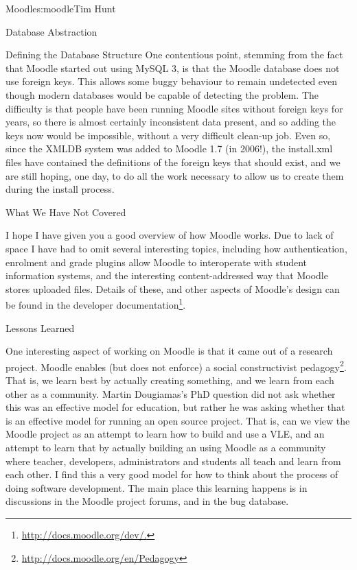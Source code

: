 \begin{aosachapter}{Moodle}{s:moodle}{Tim Hunt}
\begin{aosasect1}{Database Abstraction}
\begin{aosasect2}{Defining the Database Structure}
One contentious point, stemming from the fact that Moodle started out
using MySQL 3, is that the Moodle database does not use foreign
keys. This allows some buggy behaviour to remain undetected even
though modern databases would be capable of detecting the problem. The
difficulty is that people have been running Moodle sites without
foreign keys for years, so there is almost certainly inconsistent data
present, and so adding the keys now would be impossible, without a
very difficult clean-up job. Even so, since the XMLDB system was added
to Moodle 1.7 (in 2006!), the install.xml files have contained the
definitions of the foreign keys that should exist, and we are still
hoping, one day, to do all the work necessary to allow us to create
them during the install process.

\end{aosasect2}

\end{aosasect1}

\begin{aosasect1}{What We Have Not Covered}

I hope I have given you a good overview of how Moodle works. Due to
lack of space I have had to omit several interesting topics, including
how authentication, enrolment and grade plugins allow Moodle to
interoperate with student information systems, and the interesting
content-addressed way that Moodle stores uploaded files. Details of
these, and other aspects of Moodle's design can be found in the
developer documentation\footnote{\url{http://docs.moodle.org/dev/.}}.

\end{aosasect1}

\begin{aosasect1}{Lessons Learned}

One interesting aspect of working on Moodle is that it came out of a
research project. Moodle enables (but does not enforce) a social
constructivist
pedagogy\footnote{\url{http://docs.moodle.org/en/Pedagogy}}. That is,
we learn best by actually creating something, and we learn from each
other as a community. Martin Dougiamas's PhD question did not ask
whether this was an effective model for education, but rather he was
asking whether that is an effective model for running an open source
project. That is, can we view the Moodle project as an attempt to
learn how to build and use a VLE, and an attempt to learn that by
actually building an using Moodle as a community where teacher,
developers, administrators and students all teach and learn from each
other. I find this a very good model for how to think about the
process of doing software development. The main place this learning
happens is in discussions in the Moodle project forums, and in the bug
database.


\end{aosasect1}
\end{aosachapter}
